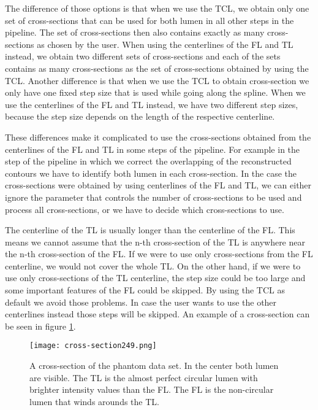 \documentclass[thesis.tex]{subfiles}
\begin{document}
The difference of those options is that when we use the TCL, we obtain only one set of cross-sections that can be used for both lumen in all other steps in the pipeline. The set of cross-sections then also contains exactly as many cross-sections as chosen by the user. When using the centerlines of the FL and TL instead, we obtain two different sets of cross-sections and each of the sets contains as many cross-sections as the set of cross-sections obtained by using the TCL. Another difference is that when we use the TCL to obtain cross-section we only have one fixed step size that is used while going along the spline. When we use the centerlines of the FL and TL instead, we have two different step sizes, because the step size depends on the length of the respective centerline.

These differences make it complicated to use the cross-sections obtained from the centerlines of the FL and TL in some steps of the pipeline. For example in the step of the pipeline in which we correct the overlapping of the reconstructed contours we have to identify both lumen in each cross-section. In the case the cross-sections were obtained by using centerlines of the FL and TL, we can either ignore the parameter that controls the number of cross-sections to be used and process all cross-sections, or we have to decide which cross-sections to use.

The centerline of the TL is usually longer than the centerline of the FL. This means we cannot assume that the n-th cross-section of the TL is anywhere near the n-th cross-section of the FL. If we were to use only cross-sections from the FL centerline, we would not cover the whole TL. On the other hand, if we were to use only cross-sections of the TL centerline, the step size could be too large and some important features of the FL could be skipped. By using the TCL as default we avoid those problems. In case the user wants to use the other centerlines instead those steps will be skipped. An example of a cross-section can be seen in figure \ref{fig:cross-section}.

\begin{figure}[h]
\centering
\texttt{[image: cross-section249.png]}
\caption{A cross-section of the phantom data set. In the center both lumen are visible. The TL is the almost perfect circular lumen with brighter intensity values than the FL. The FL is the non-circular lumen that winds arounds the TL.}
\label{fig:cross-section}
\end{figure}  
\end{document}

